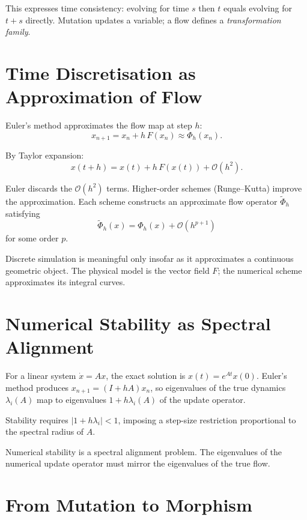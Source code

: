 \documentclass[12pt,openany]{book}
\begin{document}
This expresses time consistency: evolving for time $s$ then $t$ equals evolving
for $t+s$ directly. Mutation updates a variable; a flow defines a
\emph{transformation family}.

\section{Time Discretisation as Approximation of Flow}

Euler's method approximates the flow map at step $h$:
\[
  x_{n+1} = x_n + h\,F(x_n) \approx \Phi_h(x_n).
\]

By Taylor expansion:
\[
  x(t+h) = x(t) + h\,F(x(t)) + \mathcal{O}(h^2).
\]

Euler discards the $\mathcal{O}(h^2)$ terms. Higher-order schemes (Runge--Kutta)
improve the approximation. Each scheme constructs an approximate flow operator
$\tilde\Phi_h$ satisfying
\[
  \tilde\Phi_h(x) = \Phi_h(x) + \mathcal{O}(h^{p+1})
\]
for some order $p$.

\begin{insight}
  Discrete simulation is meaningful only insofar as it approximates a continuous
  geometric object. The physical model is the vector field $F$; the numerical
  scheme approximates its integral curves.
\end{insight}

\section{Numerical Stability as Spectral Alignment}

For a linear system $\dot x = Ax$, the exact solution is $x(t)=e^{At}x(0)$.
Euler's method produces $x_{n+1}=(I+hA)x_n$, so eigenvalues of the true
dynamics $\lambda_i(A)$ map to eigenvalues $1+h\lambda_i(A)$ of the update
operator.

Stability requires $|1+h\lambda_i|<1$, imposing a step-size restriction
proportional to the spectral radius of $A$.

\begin{insight}
  Numerical stability is a spectral alignment problem. The eigenvalues of the
  numerical update operator must mirror the eigenvalues of the true flow.
\end{insight}

\section{From Mutation to Morphism}
\end{document}
